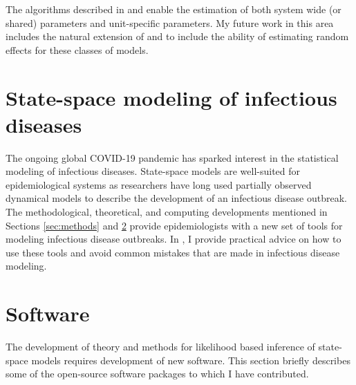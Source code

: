 \documentclass{article}
\begin{document}
The algorithms described in \cite{ionides22} and \cite{wheeler2023-b} enable the estimation of both system wide (or shared) parameters and unit-specific parameters. 
My future work in this area includes the natural extension of \cite{ionides22} and \cite{wheeler2023-b} to include the ability of estimating random effects for these classes of models.


\section{State-space modeling of infectious diseases}\label{sec:epi}

The ongoing global COVID-19 pandemic has sparked interest in the statistical modeling of infectious diseases. 
State-space models are well-suited for epidemiological systems as researchers have long used partially observed dynamical models to describe the development of an infectious disease outbreak. 
The methodological, theoretical, and computing developments mentioned in Sections \ref{sec:methods} and \ref{sec:software} provide epidemiologists with a new set of tools for modeling infectious disease outbreaks. 
In \cite{wheeler2023-c}, I provide practical advice on how to use these tools and avoid common mistakes that are made in infectious disease modeling. 

\section{Software}\label{sec:software}

The development of theory and methods for likelihood based inference of state-space models requires development of new software. 
This section briefly describes some of the open-source software packages to which I have contributed.
\end{document}
